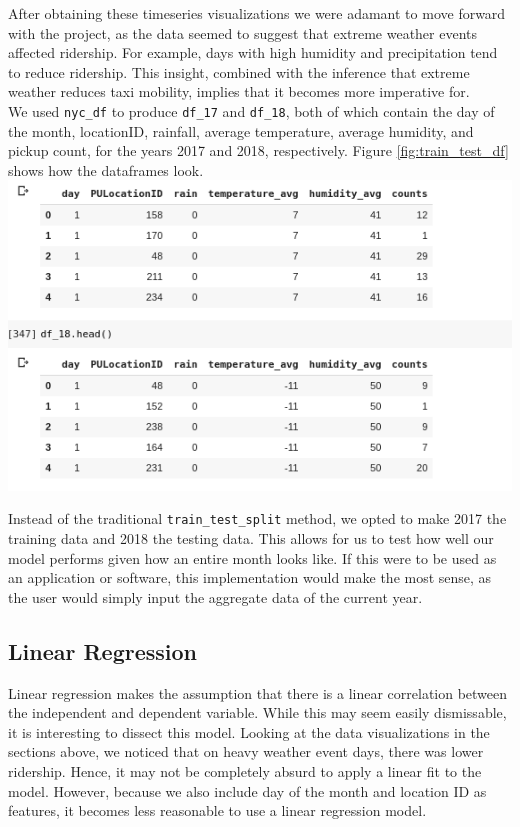 \documentclass[journal]{IEEEtran}
\newcommand{\cc}[1]{\texttt{#1}}
\begin{document}
\noindent After obtaining these timeseries visualizations we were adamant to move forward with the project, as the data seemed to suggest that extreme weather events affected ridership. For example, days with high humidity and precipitation tend to reduce ridership. This insight, combined with the inference that extreme weather reduces taxi mobility, implies that it becomes more imperative for.\\

\noindent We used \cc{nyc\_df} to produce \cc{df\_17} and \cc{df\_18}, both of which contain the day of the month, locationID, rainfall, average temperature, average humidity, and pickup count, for the years 2017 and 2018, respectively. Figure \ref{fig:train_test_df} shows how the dataframes look. \\

\begingroup
    \centering
    \includegraphics[width=\columnwidth]{report/images/train_test_df.png}
    \label{fig:train_test_df}
    \medskip
\endgroup

\noindent Instead of the traditional \cc{train\_test\_split} method, we opted to make 2017 the training data and 2018 the testing data. This allows for us to test how well our model performs given how an entire month looks like. If this were to be used as an application or software, this implementation would make the most sense, as the user would simply input the aggregate data of the current year.

\subsection{Linear Regression}

\noindent Linear regression makes the assumption that there is a linear correlation between the independent and dependent variable. While this may seem easily dismissable, it is interesting to dissect this model. Looking at the data visualizations in the sections above, we noticed that on heavy weather event days, there was lower ridership. Hence, it may not be completely absurd to apply a linear fit to the model. However, because we also include day of the month and location ID as features, it becomes less reasonable to use a linear regression model.\\
\end{document}
